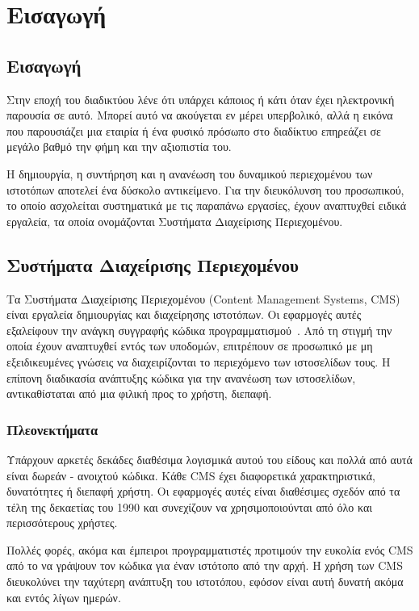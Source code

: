 \documentclass[12pt]{report}
\begin{document}
\hypersetup{pageanchor=true}
\clearpage
{}

\chapter{Εισαγωγή}\label{ch1}
\section{Εισαγωγή}
Στην εποχή του διαδικτύου λένε ότι υπάρχει κάποιος ή κάτι όταν έχει ηλεκτρονική παρουσία σε αυτό. Μπορεί αυτό να ακούγεται εν μέρει υπερβολικό, αλλά η εικόνα που παρουσιάζει μια εταιρία ή ένα φυσικό πρόσωπο στο διαδίκτυο επηρεάζει σε μεγάλο βαθμό την φήμη και την αξιοπιστία του.

Η δημιουργία, η συντήρηση και η ανανέωση του δυναμικού περιεχομένου των ιστοτόπων αποτελεί ένα δύσκολο αντικείμενο. Για την διευκόλυνση του προσωπικού, το οποίο ασχολείται συστηματικά με τις παραπάνω εργασίες, έχουν αναπτυχθεί ειδικά εργαλεία, τα οποία ονομάζονται Συστήματα Διαχείρισης Περιεχομένου.

\section{Συστήματα Διαχείρισης Περιεχομένου}
Τα Συστήματα Διαχείρισης Περιεχομένου (\textlatin{Content Management Systems, CMS}) είναι εργαλεία δημιουργίας και διαχείρησης ιστοτόπων. Οι εφαρμογές αυτές εξαλείφουν την ανάγκη συγγραφής κώδικα προγραμματισμού~\cite{linode guides & tutorials_2017}. Από τη στιγμή την οποία έχουν αναπτυχθεί εντός των υποδομών, επιτρέπουν σε προσωπικό με μη εξειδικευμένες γνώσεις να διαχειρίζονται το περιεχόμενο των ιστοσελίδων τους.
Η επίπονη διαδικασία ανάπτυξης κώδικα για την ανανέωση των ιστοσελίδων, αντικαθίσταται από μια φιλική προς το χρήστη, διεπαφή.

\subsection{Πλεονεκτήματα}
Υπάρχουν αρκετές δεκάδες διαθέσιμα λογισμικά αυτού του είδους και πολλά από αυτά είναι δωρεάν - ανοιχτού κώδικα. Κάθε \textlatin{CMS} έχει διαφορετικά χαρακτηριστικά, δυνατότητες ή διεπαφή χρήστη. Οι εφαρμογές αυτές είναι διαθέσιμες σχεδόν από τα τέλη της δεκαετίας του 1990 και συνεχίζουν να χρησιμοποιούνται από όλο και περισσότερους χρήστες.

Πολλές φορές, ακόμα και έμπειροι προγραμματιστές προτιμούν την ευκολία ενός \textlatin{CMS} από το να γράψουν τον κώδικα για έναν ιστότοπο από την αρχή. Η χρήση των \textlatin{CMS} διευκολύνει την ταχύτερη ανάπτυξη του ιστοτόπου, εφόσον είναι αυτή δυνατή ακόμα και εντός λίγων ημερών.
\end{document}
